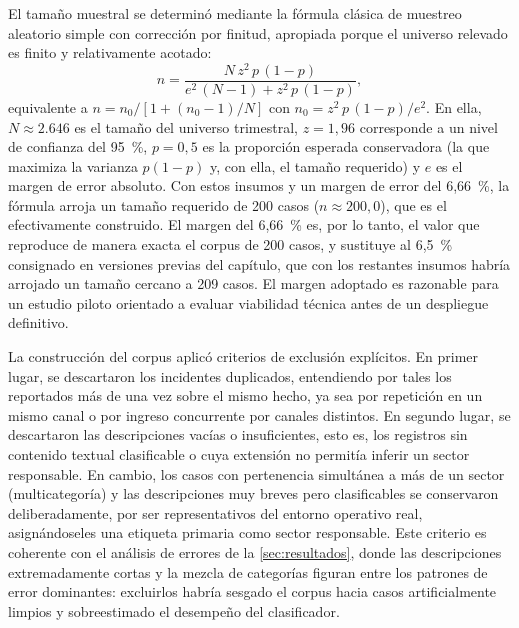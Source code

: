 El tamaño muestral se determinó mediante la fórmula clásica de muestreo aleatorio simple con corrección por finitud, apropiada porque el universo relevado es finito y relativamente acotado:
\[
n = \frac{N\, z^{2}\, p\,(1-p)}{e^{2}\,(N-1) + z^{2}\, p\,(1-p)},
\]
equivalente a \(n = n_0 / [1 + (n_0 - 1)/N]\) con \(n_0 = z^{2}\, p\,(1-p)/e^{2}\). En ella, \(N \approx 2.646\) es el tamaño del universo trimestral, \(z = 1{,}96\) corresponde a un nivel de confianza del 95~\%, \(p = 0{,}5\) es la proporción esperada conservadora (la que maximiza la varianza \(p(1-p)\) y, con ella, el tamaño requerido) y \(e\) es el margen de error absoluto. Con estos insumos y un margen de error del 6,66~\%, la fórmula arroja un tamaño requerido de 200 casos (\(n \approx 200{,}0\)), que es el efectivamente construido. El margen del 6,66~\% es, por lo tanto, el valor que reproduce de manera exacta el corpus de 200 casos, y sustituye al 6,5~\% consignado en versiones previas del capítulo, que con los restantes insumos habría arrojado un tamaño cercano a 209 casos. El margen adoptado es razonable para un estudio piloto orientado a evaluar viabilidad técnica antes de un despliegue definitivo.

La construcción del corpus aplicó criterios de exclusión explícitos. En primer lugar, se descartaron los incidentes duplicados, entendiendo por tales los reportados más de una vez sobre el mismo hecho, ya sea por repetición en un mismo canal o por ingreso concurrente por canales distintos. En segundo lugar, se descartaron las descripciones vacías o insuficientes, esto es, los registros sin contenido textual clasificable o cuya extensión no permitía inferir un sector responsable. En cambio, los casos con pertenencia simultánea a más de un sector (multicategoría) y las descripciones muy breves pero clasificables se conservaron deliberadamente, por ser representativos del entorno operativo real, asignándoseles una etiqueta primaria como sector responsable. Este criterio es coherente con el análisis de errores de la \autoref{sec:resultados}, donde las descripciones extremadamente cortas y la mezcla de categorías figuran entre los patrones de error dominantes: excluirlos habría sesgado el corpus hacia casos artificialmente limpios y sobreestimado el desempeño del clasificador.

